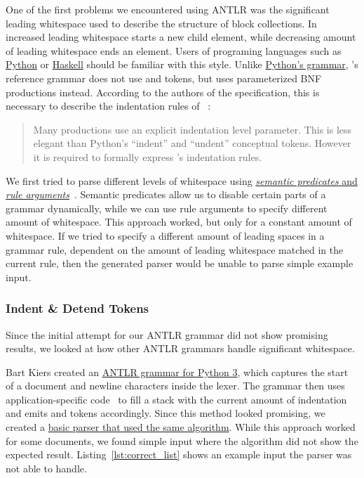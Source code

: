 One of the first problems we encountered using \gls{ANTLR} was the significant leading whitespace used to describe the structure of  block \glspl{collection}. In  increased leading whitespace starts a new child element, while decreasing amount of leading whitespace ends an element. Users of programing languages such as \href{https://www.python.org}{Python} or \href{https://www.haskell.org}{Haskell} should be familiar with this style. Unlike \href{https://docs.python.org/3/reference/grammar.html}{Python’s grammar}, ’s reference grammar does not use  and  \glspl{token}, but uses parameterized \gls{BNF} productions instead. According to the authors of the  specification, this is necessary to describe the indentation rules of ~\cite{ben2009yaml}:

\begin{quote}
  Many productions use an explicit indentation level parameter. This is less elegant than Python’s “indent” and “undent” conceptual \glspl{token}. However it is required to formally express ’s indentation rules.
\end{quote}

We first tried to parse different levels of whitespace using \href{https://github.com/sanssecours/Yan-LR/compare/0b0deae...7d9e64e}{\emph{semantic predicates} and \emph{rule arguments}}~\cite{parr1995antlr}. Semantic predicates allow us to disable certain parts of a grammar dynamically, while we can use rule arguments to specify different amount of whitespace. This approach worked, but only for a constant amount of whitespace. If we tried to specify a different amount of leading spaces in a grammar rule, dependent on the amount of leading whitespace matched in the current rule, then the generated parser would be unable to parse simple example input.

\subsubsection{Indent \& Detend Tokens}

Since the initial attempt for our \gls{ANTLR} grammar did not show promising results, we looked at how other \gls{ANTLR} grammars handle significant whitespace.

Bart Kiers created an \href{https://github.com/antlr/grammars-v4/blob/master/python3/Python3.g4}{ANTLR grammar for Python 3}, which captures the start of a document and newline characters inside the lexer. The grammar then uses application-specific code~\cite[p. 48]{parr2013definitive} to fill a stack with the current amount of indentation and emits  and  \glspl{token} accordingly. Since this method looked promising, we created a \href{https://github.com/sanssecours/Yan-LR/compare/363be1e...188e5d4}{basic  parser that used the same algorithm}. While this approach worked for some  documents, we found simple input where the algorithm did not show the expected result. Listing~\ref{lst:correct_list} shows an example input the parser was not able to handle.

